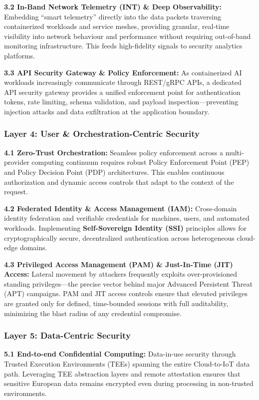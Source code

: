 \documentclass{ieeeaccess}
\begin{document}
\textbf{3.2 In-Band Network Telemetry (INT) \& Deep Observability:} Embedding ``smart telemetry'' directly into the data packets traversing containerized workloads and service meshes, providing granular, real-time visibility into network behaviour and performance without requiring out-of-band monitoring infrastructure. This feeds high-fidelity signals to security analytics platforms.

\textbf{3.3 API Security Gateway \& Policy Enforcement:} As containerized AI workloads increasingly communicate through REST/gRPC APIs, a dedicated API security gateway provides a unified enforcement point for authentication tokens, rate limiting, schema validation, and payload inspection---preventing injection attacks and data exfiltration at the application boundary.


\subsubsection*{Layer 4: User \& Orchestration-Centric Security}
\textbf{4.1 Zero-Trust Orchestration:} Seamless policy enforcement across a multi-provider computing continuum requires robust Policy Enforcement Point (PEP) and Policy Decision Point (PDP) architectures. This enables continuous authorization and dynamic access controls that adapt to the context of the request.

\textbf{4.2 Federated Identity \& Access Management (IAM):} Cross-domain identity federation and verifiable credentials for machines, users, and automated workloads. Implementing \textbf{Self-Sovereign Identity (SSI)} principles allows for cryptographically secure, decentralized authentication across heterogeneous cloud-edge domains.

\textbf{4.3 Privileged Access Management (PAM) \& Just-In-Time (JIT) Access:} Lateral movement by attackers frequently exploits over-provisioned standing privileges---the precise vector behind major Advanced Persistent Threat (APT) campaigns. PAM and JIT access controls ensure that elevated privileges are granted only for defined, time-bounded sessions with full auditability, minimizing the blast radius of any credential compromise.

\subsubsection*{Layer 5: Data-Centric Security}
\textbf{5.1 End-to-end Confidential Computing:} Data-in-use security through Trusted Execution Environments (TEEs) spanning the entire Cloud-to-IoT data path. Leveraging TEE abstraction layers and remote attestation ensures that sensitive European data remains encrypted even during processing in non-trusted environments.
\end{document}
